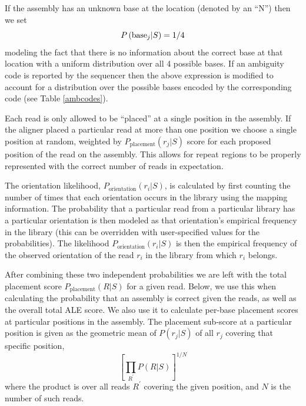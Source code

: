 \documentclass[phd,tocprelim]{cornell}
\begin{document}
If the assembly has an unknown base at the location (denoted by an “N”) then we set
\begin{equation}
    P\left({\rm base}_{j}|S\right) = 1/4
\end{equation}
modeling the fact that there is no information about the correct base at that location with a uniform distribution over all 4 possible bases. If an ambiguity code is reported by the sequencer then the above expression is modified to account for a distribution over the possible bases encoded by the corresponding code (see Table \ref{ambcodes}).

Each read is only allowed to be “placed” at a single position in the assembly. If the aligner placed a particular read at more than one position we choose a single position at random, weighted by $P_{\text{placement}}(r_{j}|S)$ score for each proposed position of the read on the assembly. This allows for repeat regions to be properly represented with the correct number of reads in expectation.

The orientation likelihood, $P_{\text{orientation}}\left(r_{i}|S\right)$, is calculated by first counting the number of times that each orientation occurs in the library using the mapping information.  The probability that a particular read from a particular library has a particular orientation is then modeled as that orientation's empirical frequency in the library (this can be overridden with user-specified values for the probabilities).  The likelihood $P_{\text{orientation}}\left(r_{i}|S\right)$ is then the empirical frequency of the observed orientation of the read $r_{i}$ in the library from which $r_{i}$ belongs.

After combining these two independent probabilities we are left with the total placement score $P_{\text{placement}}(R|S)$ for a given read.  Below, we use this when calculating the probability that an assembly is correct given the reads, as well as the overall total ALE score.  We also use it to calculate per-base placement scores at particular positions in the assembly.  The placement sub-score at a particular position is given as the geometric mean of $P(r_{j}|S)$ of all $r_{j}$ covering that specific position,
\begin{equation}
    \left[\prod_{R^{\prime}}P(R|S)\right]^{1/N}
\end{equation}
where the product is over all reads $R^{\prime}$ covering the given position, and $N$ is the number of such reads.

\end{document}
